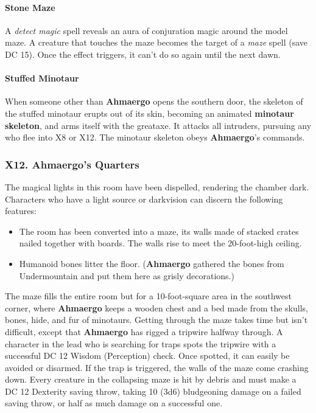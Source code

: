 \documentclass[10pt,a4paper,twoside,twocolumn,openany,nodeprecatedcode]{dndbook}
\begin{document}
\paragraph{Stone Maze}
A \textit{detect magic} spell reveals an aura of conjuration magic around the model maze. A creature that touches the maze becomes the target of a \textit{maze} spell (save DC 15). Once the effect triggers, it can't do so again until the next dawn.
\paragraph{Stuffed Minotaur}
When someone other than \textbf{Ahmaergo} opens the southern door, the skeleton of the stuffed minotaur erupts out of its skin, becoming an animated \textbf{minotaur skeleton}, and arms itself with the greataxe. It attacks all intruders, pursuing any who flee into X8 or X12. The minotaur skeleton obeys \textbf{Ahmaergo}'s commands.
\subsubsection{X12. Ahmaergo's Quarters}
The magical lights in this room have been dispelled, rendering the chamber dark. Characters who have a light source or darkvision can discern the following features:
\begin{itemize}

\item The room has been converted into a maze, its walls made of stacked crates nailed together with boards. The walls rise to meet the 20-foot-high ceiling.
\item Humanoid bones litter the floor. (\textbf{Ahmaergo} gathered the bones from Undermountain and put them here as grisly decorations.)
\end{itemize}


The maze fills the entire room but for a 10-foot-square area in the southwest corner, where \textbf{Ahmaergo} keeps a wooden chest and a bed made from the skulls, bones, hide, and fur of minotaurs.
Getting through the maze takes time but isn't difficult, except that \textbf{Ahmaergo} has rigged a tripwire halfway through. A character in the lead who is searching for traps spots the tripwire with a successful DC 12 Wisdom (Perception) check. Once spotted, it can easily be avoided or disarmed. If the trap is triggered, the walls of the maze come crashing down. Every creature in the collapsing maze is hit by debris and must make a DC 12 Dexterity saving throw, taking 10 (3d6) bludgeoning damage on a failed saving throw, or half as much damage on a successful one.
\end{document}

